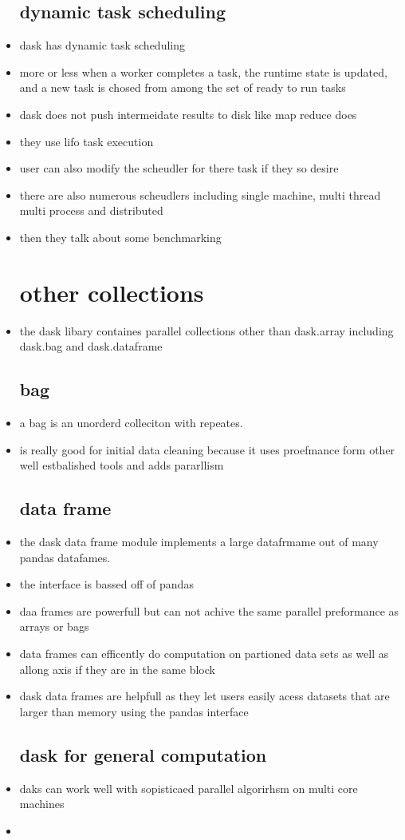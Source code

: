 \documentclass{article}
\begin{document}
\begin{itemize}
\subsection*{dynamic task scheduling}
\item dask has dynamic task scheduling
\item more or less when a worker completes a task, the runtime state is updated, and a new task is chosed from among the set of ready to run tasks 
\item dask does not push intermeidate results to disk like map reduce does
\item they use lifo task execution
\item user can also modify the scheudler for there task if they so desire 
\item there are also numerous scheudlers including single machine, multi thread multi process and distributed 
\item then they talk about some benchmarking 
\section*{other collections}
\item the dask libary containes parallel collections other than dask.array including dask.bag and dask.dataframe 
\subsection*{bag}
\item a bag is an unorderd colleciton with repeates. 
\item is really good for initial data cleaning because it uses proefmance form other well estbalished tools and adds pararllism 

\subsection*{data frame}
\item the dask data frame module implements a large datafrmame out of many pandas datafames. 
\item the interface is bassed off of pandas
\item daa frames are powerfull but can not achive the same parallel preformance as arrays or bags 
\item data frames can efficently do computation on partioned data sets as well as allong axis if they are in the same block 
\item dask data frames are helpfull as they let users easily acess datasets that are larger than memory using the pandas interface
\subsection*{dask for general computation}
\item daks can work well with sopisticaed parallel algorirhsm on multi core machines 
\item 
\end{itemize}
\end{document}
